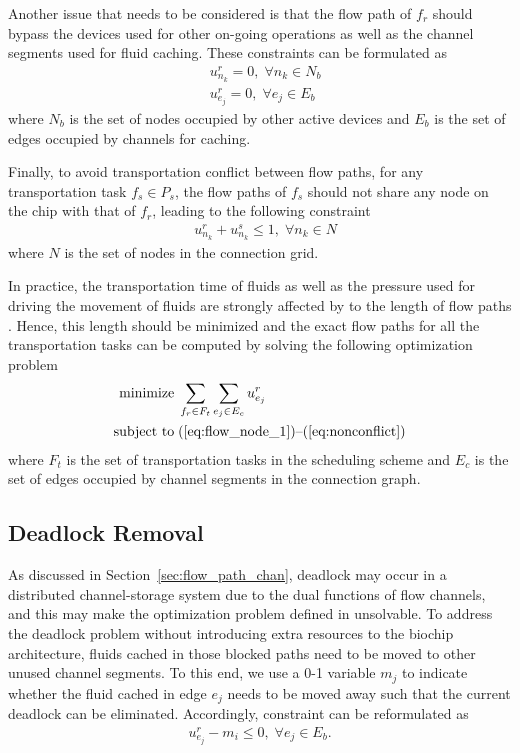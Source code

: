 Another issue that needs to be considered is that the flow path of $f_r$ should bypass the devices used for other on-going operations as well as the channel segments used for fluid caching. These constraints can be formulated as
\begin{align}
&   u^r_{n_k} = 0,\; \forall n_k\in N_b \label{eq:bypass0} \\
&   u^r_{e_j} = 0,\; \forall e_j\in E_b \label{eq:bypass}
\end{align}
where $N_b$ is the set of nodes occupied by other active devices and $E_b$ is the set of edges occupied by  channels for caching.

Finally, to avoid transportation conflict between flow paths, for any transportation task $f_s\in P_s$, the flow paths of $f_s$ should not share any node on the chip with that of $f_r$, leading to the following constraint
\begin{align}
& u^r_{n_k} + u^s_{n_k} \leq 1,\; \forall n_k\in N \label{eq:nonconflict}
\end{align}
where $N$ is the set of nodes in the connection grid.

In practice, the transportation time of fluids as well as the pressure used for driving the movement of fluids are strongly affected by to the length of flow paths \cite{hu2015fault}. Hence, this length should be minimized and the exact flow paths for all the transportation tasks can be computed by solving the following optimization problem
\begin{align}\label{eq:ILP_flow_paths}
\text{minimize} &\; \sum_{f_r\in F_t} \sum_{e_j\in E_c} u^r_{e_j} \\\label{eq:ILP_flow_paths_last}
\text{subject to} & \;
\text{(\ref{eq:flow_node_1})--(\ref{eq:nonconflict})}
\end{align}
where $F_t$ is the set of transportation tasks in the scheduling scheme and $E_c$ is the set of edges occupied by channel segments in the connection graph.

\subsection{Deadlock Removal}\label{sec:res_storage_deadlock}

As discussed in Section~\ref{sec:flow_path_chan}, deadlock may occur in a distributed channel-storage system due to the dual functions of flow channels, and this may make the optimization problem defined in \text{(\ref{eq:ILP_flow_paths})--(\ref{eq:ILP_flow_paths_last})} unsolvable. To address the deadlock problem without introducing extra resources to the biochip architecture, fluids cached in those blocked paths need to be moved to other unused channel segments. To this end, we use a 0-1 variable $m_j$ to indicate whether the fluid cached in edge $e_j$ needs to be moved away such that the current deadlock can be eliminated. Accordingly, constraint \text{(\ref{eq:bypass})} can be reformulated as
\begin{align}\label{eq:bypass_move}
   u^r_{e_j} - m_i \leq 0,\; \forall e_j\in E_b.
\end{align}

